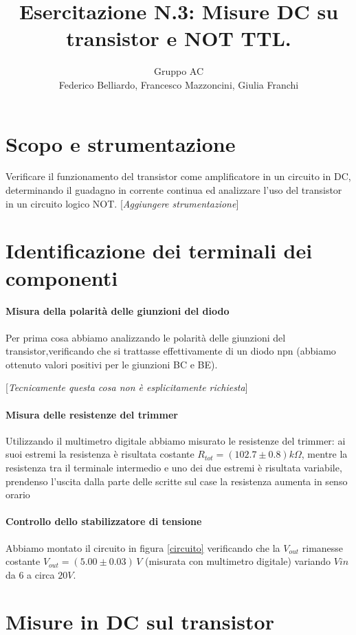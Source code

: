 \documentclass[10pt,a4paper]{article}
\author{Gruppo AC \\ Federico Belliardo, Francesco Mazzoncini, Giulia Franchi}
\title{Esercitazione N.3: Misure DC su transistor e NOT TTL.}
\newcommand{\rem}[1]{[\emph{#1}]}
\begin{document}
\maketitle
\section{Scopo e strumentazione}
Verificare il funzionamento del transistor come amplificatore in un circuito in DC, determinando il guadagno in corrente continua ed analizzare l'uso del transistor in un circuito logico NOT.
\rem{Aggiungere strumentazione}

\section{Identificazione dei terminali dei componenti}

\paragraph{Misura della polarità delle giunzioni del diodo}
Per prima cosa abbiamo analizzando le polarità delle giunzioni del transistor,verificando che si trattasse effettivamente  di un diodo npn (abbiamo ottenuto valori positivi per le giunzioni BC e BE).

\rem{Tecnicamente questa cosa non è esplicitamente richiesta}
\paragraph{Misura delle resistenze del trimmer}
Utilizzando il multimetro digitale abbiamo misurato le resistenze del trimmer: ai suoi estremi la resistenza è risultata costante $R_{tot}= (102.7 \pm 0.8) k\Omega$, mentre la resistenza tra il terminale intermedio e uno dei due estremi è risultata variabile, prendenso l'uscita dalla parte delle scritte sul case la resistenza aumenta in senso orario

\paragraph{Controllo dello stabilizzatore di tensione}
Abbiamo montato il circuito in  figura \ref{circuito} verificando che  la $V_{out}$ rimanesse costante $V_{out} = (5.00 \pm 0.03) \, V$ (misurata con multimetro digitale) variando $V{in}$ da 6 a circa $20V$. 

\section{Misure in DC sul transistor}
\end{document}
